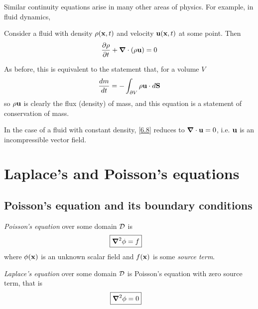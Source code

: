 \documentclass{../../template/note}
\begin{document}
    Similar continuity equations arise in many other areas of physics. For example, in fluid dynamics,
    \begin{proposition}
        \label{6.8} Consider a fluid with density \(\rho(\V x, t)\) and velocity \(\V u(\V x, t)\) at some point. Then
        \begin{align*}
            \pd \rho t + \div (\rho \V u) = 0
        \end{align*}
    \end{proposition}
    As before, this is equivalent to the statement that, for a volume \(V\)
    \begin{align*}
        \frac{dm}{dt} = -\int_{\pr V} \rho \V u \cdot d\V S
    \end{align*}
    so \(\rho \V u\) is clearly the flux (density) of mass, and this equation is a statement of conservation of mass.

    In the case of a fluid with constant density, \cref{6.8} reduces to \(\div \V u = 0\), i.e. \(\V u\) is an incompressible vector field.

    \section{Laplace's and Poisson's equations}

    \subsection{Poisson's equation and its boundary conditions}

    \begin{definition*}
        \emph{Poisson's equation} over some domain \(\mathcal{D}\) is
        \begin{align*}
            \Aboxed{\grad^2 \phi = f}
        \end{align*}
        where \(\phi(\V x)\) is an unknown scalar field and \(f(\V x)\) is some \emph{source term}.
    \end{definition*}
    
    \begin{definition*}
        \emph{Laplace's equation} over some domain \(\mathcal{D}\) is Poisson's equation with zero source term, that is
        \begin{align*}
            \Aboxed{\grad^2 \phi = 0}
        \end{align*}
    \end{definition*}
    
\end{document}
